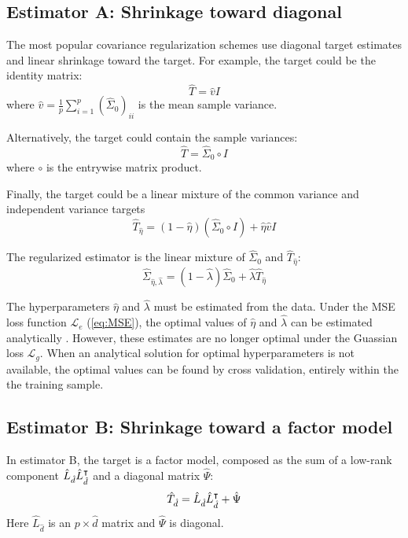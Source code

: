 \subsection*{Estimator A: Shrinkage toward diagonal}
The most popular covariance regularization schemes use diagonal target estimates and linear shrinkage toward the target.  For example, the target could be the identity matrix:  
\begin{equation}
\hat T = \hat v I
\end{equation}
where $\hat v = \frac 1 p \sum\limits_{i=1}^p(\hat\Sigma_0)_{ii}$ is the mean sample variance. 

Alternatively, the target could contain the sample variances:
\begin{equation}
\hat T= \hat\Sigma_0 \circ I 
\end{equation}
where $\circ$ is the entrywise matrix product.

Finally, the target could be a linear mixture of the common variance and independent variance targets
\begin{equation}
\hat T_{\hat\eta} = (1-\hat\eta)(\hat\Sigma_0 \circ I) + \hat\eta\hat v I
\end{equation}

The regularized estimator is the linear mixture of $\hat\Sigma_0$ and $\hat T_{\hat\eta}$:
\begin{equation}
\hat\Sigma_{\hat\eta,\hat\lambda} = (1-\hat\lambda)\hat\Sigma_0 + \hat\lambda \hat T_{\hat\eta} 
\end{equation}

The hyperparameters $\hat\eta$ and $\hat\lambda$ must be estimated from the data.  Under the MSE loss function $\mathcal L_e$ (\ref{eq:MSE}), the optimal values of $\hat\eta$ and $\hat\lambda$ can be estimated analytically \cite{Ledoit:2004,Schafer:2005,Schaefer:2010}. However, these estimates are no longer optimal under the Guassian loss $\mathcal L_g$.   When an analytical solution for optimal hyperparameters is not available, the optimal values can be found by cross validation, entirely within the the training sample. 


\subsection*{Estimator B: Shrinkage toward a factor model}
In estimator B, the target is a factor model, composed as the sum of a low-rank component $\hat L_{\hat d}\hat L_{\hat d}^\intercal$ and a diagonal matrix $\hat \Psi$:
\begin{equation}
\hat T_{\hat d} = \hat L_{\hat d} \hat L_{\hat d}^\intercal + \hat\Psi
\end{equation}
Here $\hat L_{\hat d}$ is an $p\times\hat d$ matrix and $\hat\Psi$ is diagonal.  

